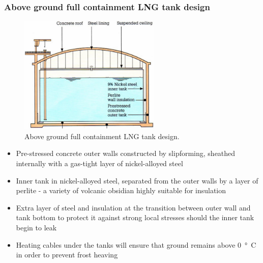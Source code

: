 \subsubsection{Above ground full containment LNG tank design}
\begin{figure}[H]
    \centering
    \includegraphics[width = 0.6\textwidth]{img/figure64.png}
    \caption{Above ground full containment LNG tank design.}
\end{figure}
\begin{itemize}
    \item Pre-stressed concrete outer walls constructed by slipforming, sheathed internally with a gas-tight layer of nickel-alloyed steel
    \item Inner tank in nickel-alloyed steel, separated from the outer walls by a layer of perlite - a variety of volcanic obsidian highly suitable for insulation
    \item Extra layer of steel and insulation at the transition between outer wall and tank bottom to protect it against strong local stresses should the inner tank begin to leak
    \item Heating cables under the tanks will ensure that ground remains above \SI{0}{\degree C} in order to prevent frost heaving
\end{itemize}
